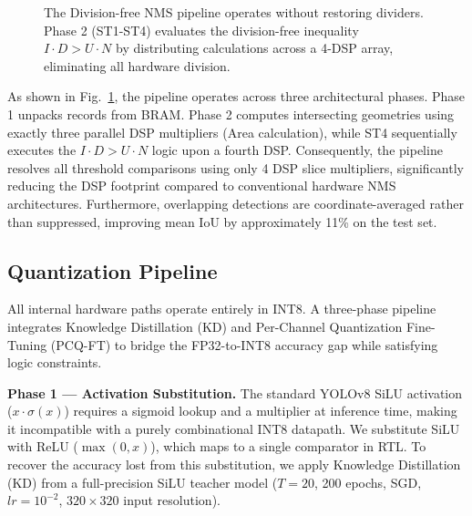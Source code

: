 \documentclass{svproc}
\begin{document}
\begin{figure}[H]
{
}
\caption{The Division-free NMS pipeline operates without restoring dividers. Phase 2 (ST1-ST4) evaluates the division-free inequality $I \cdot D > U \cdot N$ by distributing calculations across a 4-DSP array, eliminating all hardware division.}
\label{fig:nms_pipeline}
\end{figure}

As shown in Fig.~\ref{fig:nms_pipeline}, the pipeline operates across three architectural phases. Phase 1 unpacks records from BRAM. Phase 2 computes intersecting geometries using exactly three parallel DSP multipliers (Area calculation), while ST4 sequentially executes the $I \cdot D > U \cdot N$ logic upon a fourth DSP. Consequently, the pipeline resolves all threshold comparisons using only 4 DSP slice multipliers, significantly reducing the DSP footprint compared to conventional hardware NMS architectures. Furthermore, overlapping detections are coordinate-averaged rather than suppressed, improving mean IoU by approximately 11\% on the test set.

\subsection{Quantization Pipeline}
All internal hardware paths operate entirely in INT8. A three-phase pipeline integrates Knowledge Distillation (KD) and Per-Channel Quantization Fine-Tuning (PCQ-FT) to bridge the FP32-to-INT8 accuracy gap while satisfying logic constraints.

\textbf{Phase 1 --- Activation Substitution.}
The standard YOLOv8 SiLU activation ($x \cdot \sigma(x)$) requires a sigmoid lookup and a multiplier at inference time, making it incompatible with a purely combinational INT8 datapath. We substitute SiLU with ReLU ($\max(0, x)$), which maps to a single comparator in RTL. To recover the accuracy lost from this substitution, we apply Knowledge Distillation (KD) from a full-precision SiLU teacher model ($T=20$, 200 epochs, SGD, $lr=10^{-2}$, $320{\times}320$ input resolution).
\end{document}
